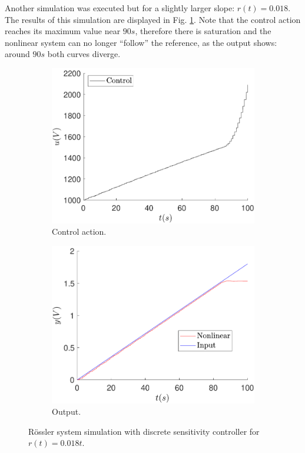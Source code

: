     Another simulation was executed but for a slightly larger slope: $r(t)=0.018$. The results of this simulation are displayed in Fig. \ref{fig:sens_ref_0_018t}. Note that the control action reaches its maximum value near $90s$, therefore there is saturation and the nonlinear system can no longer ``follow'' the reference, as the output shows: around $90s$ both curves diverge.
    
    \begin{figure}
        \centering
        \begin{subfigure}[b]{0.475\textwidth}
            \centering
            \includegraphics[scale=0.425]{files/heuristic/Sensitivity/control_sens_ramp_ref_0_018.pdf}
            \caption{Control action.}
        \end{subfigure}
        \vskip0.1cm
        \begin{subfigure}[b]{0.475\textwidth}   
            \centering 
            \includegraphics[scale=0.425]{files/heuristic/Sensitivity/sens_ramp_ref_0_018.pdf}
            \caption{Output.}
        \end{subfigure}
        \caption{Rössler system simulation with discrete sensitivity controller for $r(t)=0.018t$.}
        \label{fig:sens_ref_0_018t}
	\end{figure}
    
